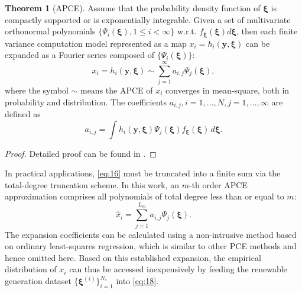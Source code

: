 \documentclass[journal]{IEEEtran}
\theoremstyle{definition}
\newtheorem{theorem}{Theorem}
\theoremstyle{remark}
\begin{document}
\begin{theorem}[APCE]\label{the:1}
Assume that the probability density function of $\boldsymbol{\xi}$ is compactly supported or is exponentially integrable. Given a set of multivariate orthonormal polynomials $\{\Psi_i(\boldsymbol{\xi}),1\leq i<\infty\}$ w.r.t. $f_{\boldsymbol{\xi}}(\boldsymbol{\xi})d\boldsymbol{\xi}$, then each finite variance computation model represented as a map $x_i=h_i(\boldsymbol{y},\boldsymbol{\xi})$ can be expanded as a Fourier series composed of $\{\Psi_i(\boldsymbol{\xi})\}$:  
\begin{equation}\label{eq:16}
    x_i=h_i(\boldsymbol{y},\boldsymbol{\xi})\sim \sum\limits_{j=1}^{\infty}a_{i,j}\Psi_j(\boldsymbol{\xi}),
\end{equation}
where the symbol $\sim$ means the APCE of $x_i$ converges in mean-square, both in probability and distribution.
The coefficients $a_{i,j},i=1,\dots,N,j=1,\dots,\infty$ are defined as
\begin{equation}
    a_{i,j}=\int h_i(\boldsymbol{y},\boldsymbol{\xi})\Psi_j(\boldsymbol{\xi})f_{\boldsymbol{\xi}}(\boldsymbol{\xi}) \, d\boldsymbol{\xi}.
\end{equation}
\end{theorem}
\begin{proof}
    Detailed proof can be found in \cite{rahman2018polynomial}.
\end{proof}
In practical applications, \eqref{eq:16} must be truncated into a finite sum via the total-degree truncation scheme. In this work, an $m$-th order APCE approximation comprises all polynomials of total degree less than or equal to $m$:
\begin{equation}\label{eq:18}
    \hat{x}_i=\sum\limits_{j=1}^{L_{m}}a_{i,j}\Psi_j(\boldsymbol{\xi}).
\end{equation}
The expansion coefficients can be calculated using a non-intrusive method based on ordinary least-squares regression, which is similar to other PCE methods and hence omitted here. Based on this established expansion, the empirical distribution of $x_i$ can thus be accessed inexpensively by feeding the renewable generation dataset $\{\boldsymbol{\xi}^{(i)}\}_{i=1}^{N_s}$ into \eqref{eq:18}.
\end{document}
